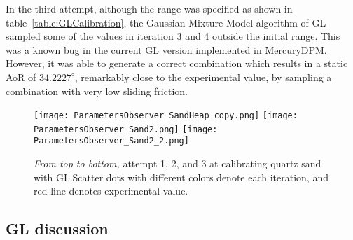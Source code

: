In the third attempt, although the range was specified as shown in table~\ref{table:GLCalibration}, the Gaussian Mixture Model algorithm of GL sampled some of the values in iteration 3 and 4 outside the initial range. This was a known bug in the current GL version implemented in MercuryDPM. However, it was able to generate a correct combination which results in a static AoR of $34.2227^{\circ}$, remarkably close to the experimental value, by sampling a combination with very low sliding friction. 


\begin{figure}[H]
    \centering
    \texttt{[image: ParametersObserver\_SandHeap\_copy.png]}
    \texttt{[image: ParametersObserver\_Sand2.png]}
    \texttt{[image: ParametersObserver\_Sand2\_2.png]}
    \caption{\textit{From top to bottom,} attempt 1, 2, and 3 at calibrating quartz sand with GL.\@ Scatter dots with different colors denote each iteration, and red line denotes experimental value.}\label{fig:QuartzGL}
\end{figure}

\begin{table}[ht]
    \centering
    \caption{Calibration results of sand with GL.}\label{table:resSandGL}
\end{table}
    
        
\subsection{GL discussion}

